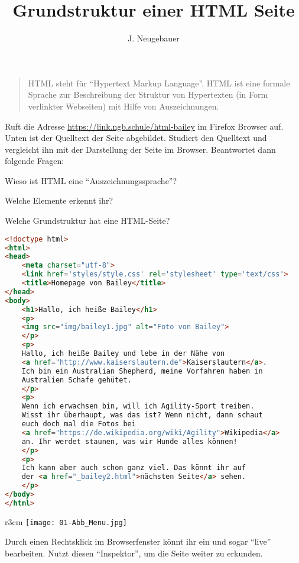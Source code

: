 \documentclass[a4paper,11pt]{scrartcl}
\author{J. Neugebauer}
\title{Grundstruktur einer HTML Seite}
\date{\Heute}
\begin{document}
\ReiheTitel

\begin{quote}
HTML steht für \enquote{Hypertext Markup Language}. HTML ist eine formale Sprache zur Beschreibung der Struktur von Hypertexten (in Form verlinkter Webseiten) mit Hilfe von Auszeichnungen.
\end{quote}

\begin{aufgabe}
Ruft die Adresse \url{https://link.ngb.schule/html-bailey} im Firefox Browser auf. Unten ist der Quelltext der Seite abgebildet. Studiert den Quelltext und vergleicht ihn mit der Darstellung der Seite im Browser. Beantwortet dann folgende Fragen:
\begin{smallenumerate}
	\item  Wieso ist HTML eine \enquote{Auszeichnungssprache}?
	\item Welche Elemente erkennt ihr?
	\item Welche Grundstruktur hat eine HTML-Seite?
\end{smallenumerate}
\begin{lstlisting}[language=HTML,basicstyle=\scriptsize\ttfamily]
<!doctype html>
<html>
<head>
	<meta charset="utf-8">
	<link href='styles/style.css' rel='stylesheet' type='text/css'>
	<title>Homepage von Bailey</title>
</head>
<body>
	<h1>Hallo, ich heiße Bailey</h1>
	<p>
	<img src="img/bailey1.jpg" alt="Foto von Bailey">
	</p>
	<p>
	Hallo, ich heiße Bailey und lebe in der Nähe von 
	<a href="http://www.kaiserslautern.de">Kaiserslautern</a>. 
	Ich bin ein Australian Shepherd, meine Vorfahren haben in 
	Australien Schafe gehütet.
	</p>
	<p>
	Wenn ich erwachsen bin, will ich Agility-Sport treiben. 
	Wisst ihr überhaupt, was das ist? Wenn nicht, dann schaut 
	euch doch mal die Fotos bei 
	<a href="https://de.wikipedia.org/wiki/Agility">Wikipedia</a> 
	an. Ihr werdet staunen, was wir Hunde alles können!
	</p>
	<p>
	Ich kann aber auch schon ganz viel. Das könnt ihr auf 
	der <a href="_bailey2.html">nächsten Seite</a> sehen.
	</p>
</body>
</html>
\end{lstlisting}
\end{aufgabe}

\begin{aufgabe}
	\begin{wrapfigure}{r}{3cm}
		\texttt{[image: 01-Abb\_Menu.jpg]}
	\end{wrapfigure}
	Durch einen Rechtsklick im Browserfenster könnt ihr ein  und sogar \enquote{live} bearbeiten. Nutzt diesen \enquote{Inspektor}, um die Seite weiter zu erkunden.
\end{aufgabe}
\end{document}
